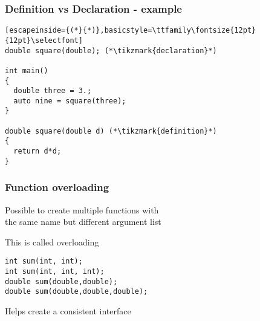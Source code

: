\documentclass[14pt,a4paper,dvipsnames,usenames]{beamer}
\begin{document}
\begin{frame}[fragile]
  \frametitle{Definition vs Declaration - example}

  \begin{lstlisting}[escapeinside={(*}{*)},basicstyle=\ttfamily\fontsize{12pt}{12pt}\selectfont]
double square(double); (*\tikzmark{declaration}*)

int main()
{
  double three = 3.;
  auto nine = square(three);
}

double square(double d) (*\tikzmark{definition}*)
{
  return d*d;
}
  \end{lstlisting}

  \nointerlineskip

\end{frame}

\begin{frame}[fragile]
  \frametitle{Function overloading}

  Possible to create multiple functions with\\the same name but different argument list

  \vspace{.5em}
  This is called {\color{Tropiteal}overloading}

  \vspace{.5em}
  \begin{lstlisting}
int sum(int, int);
int sum(int, int, int);
double sum(double,double);
double sum(double,double,double);
  \end{lstlisting}

  \vspace{.5em}
  Helps create a consistent interface
  
\end{frame}
\end{document}
